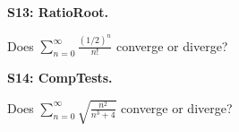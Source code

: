 \documentclass[12pt]{article}
\newcommand{\<}{\left\langle}
\renewcommand{\>}{\right\rangle}
\newcommand{\exerciseHeader}[4]{


  \vspace{0.5em}
  \textbf{#2}
  \vspace{0.5em}

}
\begin{document}
\begin{multicols}{2}
%

%

\exerciseHeader{2017 July 18}{S13: RatioRoot.}{
Use the ratio and root tests to determine series convergence.
}{2/3}

Does \(\displaystyle\sum_{n=0}^\infty\frac{(1/2)^n}{n!}\)
converge or diverge?



%

%

%

%

\exerciseHeader{2017 July 20}{S14: CompTests.}{
Use the comparison tests to determine series convergence.
}{3/3}

Does \(\displaystyle\sum_{n=0}^\infty\sqrt{\frac{n^2}{n^3+4}}\)
converge or diverge?




\end{multicols}
\end{document}
